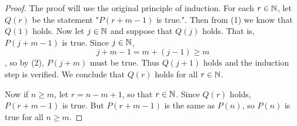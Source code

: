 \begin{proof}
	The proof will use the original principle of induction. For each $r\in \mathbb{N}$, let $Q(r)$ be the statement "$P(r+m-1)$ is true.". Then from (1) we know that $Q(1)$ holds. Now let $j\in \mathbb{N}$ and suppose that $Q(j)$ holds. That is, $P(j+m-1)$ is true. Since $j\in\mathbb{N}$,
	$$j+m-1=m+(j-1)\geq m$$,
	so by (2), $P(j+m)$ must be true. Thus $Q(j+1)$ holds and the induction step is verified. We conclude that $Q(r)$ holds for all $r\in\mathbb{N}$.
	
	Now if $n\geq m$, let $r=n-m+1$, so that $r\in\mathbb{N}$. Since $Q(r)$ holds, $P(r+m-1)$ is true. But $P(r+m-1)$ is the same as $P(n)$, so $P(n)$ is true for all $n\geq m$.
\end{proof}





























































